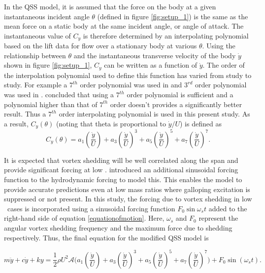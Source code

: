In the QSS model, it is assumed that the force on the body at a given instantaneous incident angle $\theta$ (defined in figure \ref{fig:setup_1}) is the same as the mean force on a static body at the same incident angle, or angle of attack. The instantaneous value of $C_y$ is therefore determined by an interpolating polynomial based on the lift data for flow over a stationary body at various $\theta$. Using the relationship between $\theta$ and the instantaneous transverse velocity of the body $\dot{y}$ shown in figure \ref{fig:setup_1}, $C_y$ can be written as a function of $\dot{y}$. The order of the interpolation polynomial used to define this function has varied from study to study. For  example a $7^{th}$ order polynomial was used in \cite{Parkinson1964} and $3^{rd}$ order polynomial was used in \cite{Barrero-Gil2009}. \cite{Ng2005} concluded that using a $7^{th}$ order polynomial is sufficient and a polynomial higher than that of $7^{th}$ order doesn't provides a significantly better result. Thus a $7 ^{th}$ order interpolating polynomial is used in this present study. As a result, $C_y(\theta)$ (noting that theta is proportional to $\dot{y}/U$) is defined as
\begin{equation}
\label{cy ploynomial}
C_y(\theta)=a_1\left(\frac{\dot{y}}{U}\right)+a_3\left(\frac{\dot{y}}{U}\right)^3+a_5\left(\frac{\dot{y}}{U}\right)^5+a_7\left(\frac{\dot{y}}{U}\right)^7.
\end{equation}


 It is expected that vortex shedding will be well correlated along the span and provide significant forcing at low \reynoldsnumber. \citet{Joly2012} introduced  an additional sinusoidal forcing function to the hydrodynamic forcing to model this. This enables the model to provide accurate predictions even at low mass ratios where galloping excitation is suppressed or not present. In this study, the forcing due to vortex shedding in low \reynoldsnumber\ cases is incorporated using a sinusoidal forcing function $F_0\sin{\omega_{s}t}$ added to the right-hand side of equation \ref{equationofmotion}. Here, $\omega_{s}$ and $F_0$ represent the angular vortex shedding frequency and the maximum force due to shedding respectively. Thus, the final equation for the modified QSS model is

\begin{equation}
\label{final_equation_motion}
m\ddot{y}{+}c\dot{y}{+}ky{=}\frac{1}{2}\rho U^2 \mathcal  {A} \Bigg(a_1\left(\frac{\dot{y}}{U}\right){+}a_3\left(\frac{\dot{y}}{U}\right)^3{+}a_5\left(\frac{\dot{y}}{U}\right)^5{+}a_7\left(\frac{\dot{y}}{U}\right)^7 \Bigg){+} F_0\sin{(\omega_s t)}.
\end{equation}

